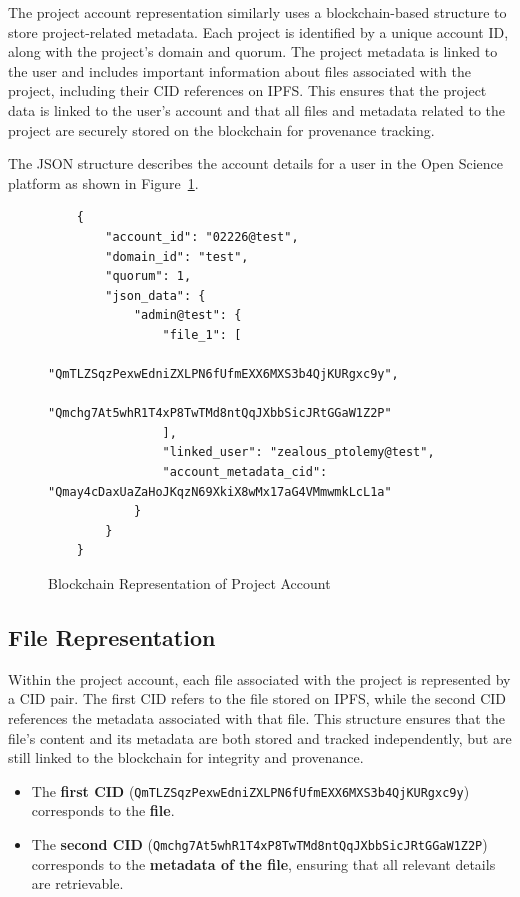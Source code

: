 \documentclass{article}
\begin{document}
The project account representation similarly uses a blockchain-based structure to store project-related metadata. Each project is identified by a unique account ID, along with the project’s domain and quorum. The project metadata is linked to the user and includes important information about files associated with the project, including their CID references on IPFS. This ensures that the project data is linked to the user’s account and that all files and metadata related to the project are securely stored on the blockchain for provenance tracking.

The JSON structure describes the account details for a user in the Open Science platform as shown in Figure~\ref{fig:project_blockchain_representation}.


\begin{figure}[h]
      \centering
      \caption{Blockchain Representation of Project Account}
      \label{fig:project_blockchain_representation}
      \begin{verbatim}
    {
        "account_id": "02226@test",
        "domain_id": "test",
        "quorum": 1,
        "json_data": {
            "admin@test": {
                "file_1": [
                    "QmTLZSqzPexwEdniZXLPN6fUfmEXX6MXS3b4QjKURgxc9y",
                    "Qmchg7At5whR1T4xP8TwTMd8ntQqJXbbSicJRtGGaW1Z2P"
                ],
                "linked_user": "zealous_ptolemy@test",
                "account_metadata_cid": "Qmay4cDaxUaZaHoJKqzN69XkiX8wMx17aG4VMmwmkLcL1a"
            }
        }
    }
    \end{verbatim}
\end{figure}


\subsection*{File Representation}

Within the project account, each file associated with the project is represented by a CID pair. The first CID refers to the file stored on IPFS, while the second CID references the metadata associated with that file. This structure ensures that the file's content and its metadata are both stored and tracked independently, but are still linked to the blockchain for integrity and provenance.

\begin{itemize}
      \item The \textbf{first CID} (\texttt{QmTLZSqzPexwEdniZXLPN6fUfmEXX6MXS3b4QjKURgxc9y}) corresponds to the \textbf{file}.
      \item The \textbf{second CID} (\texttt{Qmchg7At5whR1T4xP8TwTMd8ntQqJXbbSicJRtGGaW1Z2P}) corresponds to the \textbf{metadata of the file}, ensuring that all relevant details are retrievable.
\end{itemize}
\end{document}
